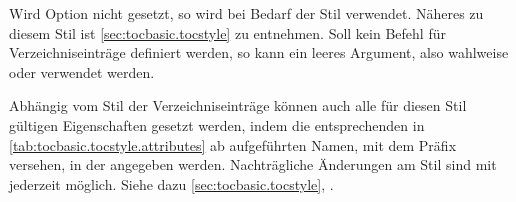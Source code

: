 Wird Option
 nicht gesetzt, so wird bei Bedarf der Stil
 verwendet. Näheres zu diesem Stil ist
\autoref{sec:tocbasic.tocstyle} zu entnehmen. Soll kein Befehl für
Verzeichniseinträge definiert werden, so kann ein leeres Argument, also
wahlweise \iffree{}{\unskip} oder
 verwendet werden.

Abhängig vom Stil der
Verzeichniseinträge können auch alle für diesen Stil gültigen Eigenschaften
gesetzt werden, indem die entsprechenden in
\autoref{tab:tocbasic.tocstyle.attributes} ab
 aufgeführten Namen, mit dem
Präfix  versehen, in der  angegeben
werden. Nachträgliche Änderungen am Stil sind mit
%
%
 jederzeit
möglich. Siehe dazu \autoref{sec:tocbasic.tocstyle},
.

